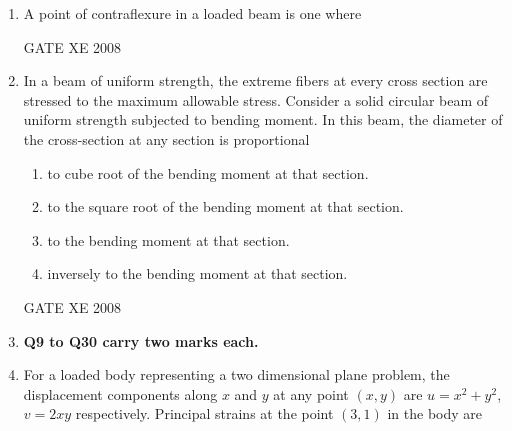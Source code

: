 \documentclass[12pt]{article}
\begin{document}
\begin{enumerate}[label=Q\arabic*.]
\item A point of contraflexure in a loaded beam is one where 

\begin{enumerate}[label=(\Alph*)]
\end{enumerate}

GATE XE 2008

\item In a beam of uniform strength, the extreme fibers at every cross section are stressed to the maximum allowable stress. Consider a solid circular beam of uniform strength subjected to bending moment. In this beam, the diameter of the cross-section at any section is proportional  

\begin{enumerate}[label=(\Alph*)]
\item  to cube root of the bending moment at that section. 
\item  to the square root of the bending moment at that section.  
\item  to the bending moment at that section.  
\item  inversely to the bending moment at that section. 
\end{enumerate}

GATE XE 2008

\item[] \textbf{Q9 to Q30 carry two marks each.}


\item For a loaded body representing a two dimensional plane problem, the displacement components along $x$ and $y$ at any point $(x, y)$ are $u = x^2 + y^2$, $v = 2xy$ respectively. Principal strains at the point $(3, 1)$ in the body are 

\begin{enumerate}[label=(\Alph*)]
\end{enumerate}


\end{enumerate}
\end{document}
